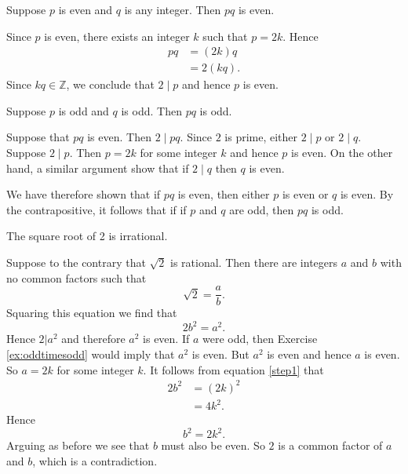 \documentclass{math265}
\begin{document}
\begin{exercise}{1.1} Suppose $p$ is even and $q$ is any integer.
  Then $pq$ is even.
\end{exercise}
\begin{pf}
Since $p$ is even, there exists an integer $k$ such that
$p=2k$.  Hence
\begin{align*}
  pq &= (2k)q\\
     &= 2(kq).
\end{align*}
Since $kq\in\mathbb{Z}$, we conclude that $2 \mid p$ and hence $p$ is even.
\end{pf}

\begin{exercise}{1.2}\label{ex:oddtimesodd} 
  Suppose $p$ is odd and $q$ is odd.
  Then $pq$ is odd.
\end{exercise}
\begin{pf}
Suppose that $pq$ is even.  Then $2\mid pq$.  Since $2$ is prime,
either $2\mid p$ or $2\mid q$.  Suppose $2\mid p$.  Then $p=2k$ for some
integer $k$ and hence $p$ is even.  On the other hand, a
similar argument show that if $2\mid q$ then $q$ is even.  

We have therefore shown that if $pq$ is even, then either $p$ is
even or $q$ is even.  By the contrapositive,  it follows that if
if $p$ and $q$ are odd, then $pq$ is odd.
\end{pf}

\begin{exercise}{1.3} The square root of 2 is irrational.
\end{exercise}
\begin{pf}
Suppose to the contrary that $\sqrt{2}$ is rational. Then
there are integers $a$ and $b$ with no common factors such that 
\begin{equation*}
\sqrt{2} = \frac{a}{b}.
\end{equation*}
Squaring this equation we find that
\begin{equation}\label{step1}
2 b^2 = a^2.
\end{equation}
Hence $2|a^2$ and therefore $a^2$ is even.  
If $a$ were odd, then Exercise \ref{ex:oddtimesodd} would imply
that $a^2$ is even. But $a^2$ is even and hence $a$ is even.
So $a=2k$ for some integer $k$.  It follows from equation
\eqref{step1} that 
\begin{align*}
  2 b^2 &= (2k)^2\\
        &= 4 k^2.
\end{align*}
Hence
\begin{equation*}
b^2 = 2 k^2.
\end{equation*}
Arguing as before we see that $b$ must also be even.  So $2$ is a
common factor of $a$ and $b$, which is a contradiction.
\end{pf}
\end{document}
